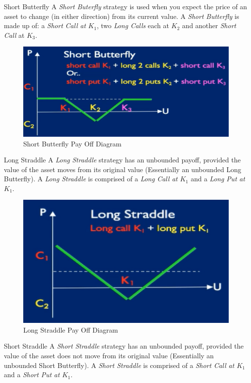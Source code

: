 \documentclass[11pt,a4paper]{article}
\begin{document}
  \begin{definition}{Short Butterfly}
    A \textit{Short Buterfly} strategy is used when you expect the price of an asset to change (in either direction) from its current value. A \textit{Short Butterfly} is made up of: a \textit{Short Call at $K_1$}, two \textit{Long Calls} each at $K_2$ and another \textit{Short Call} at $K_3$.
  \end{definition}

  \begin{figure}[ht!]
    \centering
    \includegraphics[width=.5\textwidth]{shortButterfly.PNG}
    \caption{Short Butterfly Pay Off Diagram}
  \end{figure}

  \begin{definition}{Long Straddle}
    A \textit{Long Straddle} strategy has an unbounded payoff, provided the value of the asset moves from its original value (Essentially an unbounded Long Butterfly). A \textit{Long Straddle} is comprised of a \textit{Long Call at $K_1$} and a \textit{Long Put at $K_1$}.
  \end{definition}

  \begin{figure}[ht!]
    \centering
    \includegraphics[width=.5\textwidth]{longStraddle.PNG}
    \caption{Long Straddle   Pay Off Diagram}
  \end{figure}

  \begin{definition}{Short Straddle}
    A \textit{Short Straddle} strategy has an unbounded payoff, provided the value of the asset does not move from its original value (Essentially an unbounded Short Butterfly). A \textit{Short Straddle} is comprised of a \textit{Short Call at $K_1$} and a \textit{Short Put at $K_1$}.
  \end{definition}
\end{document}
